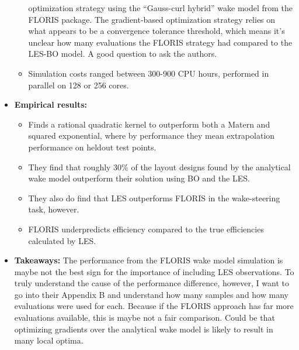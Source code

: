 \documentclass[12pt]{article}
\begin{document}
\begin{itemize}
\begin{itemize}
            optimization strategy using the ``Gauss-curl hybrid'' wake model from the FLORIS
            package. The gradient-based optimization strategy relies on what appears to be
            a convergence tolerance threshold, which means it's unclear
            how many evaluations the FLORIS strategy had compared to the LES-BO model.
            A good question to ask the authors.
        \item Simulation costs ranged between 300-900 CPU hours, performed in
            parallel on 128 or 256 cores.
    \end{itemize}
    \item \textbf{Empirical results:}
        \begin{itemize}
            \item Finds a rational quadratic kernel to outperform both a Matern
                and squared exponential, where by performance they mean extrapolation performance
                on heldout test points.
            \item They find that roughly 30\% of the layout designs found by the analytical wake model
                outperform their solution using BO and the LES.
            \item They also do find that LES outperforms FLORIS in the wake-steering task,
                however.
            \item FLORIS underpredicts efficiency compared to the true
                efficiencies calculated by LES.
        \end{itemize}
    \item \textbf{Takeaways:} The performance from the FLORIS wake model simulation is
        maybe not the best sign for the importance of including LES observations. To truly
        understand the cause of the performance difference, however, I want to go into
        their Appendix B and understand how many samples and how many evaluations were used
        for each. Because if the FLORIS approach has far more evaluations available, this
        is maybe not a fair comparison. Could be that optimizing gradients over the analytical
        wake model is likely to result in many local optima.
\end{itemize}

\end{document}
